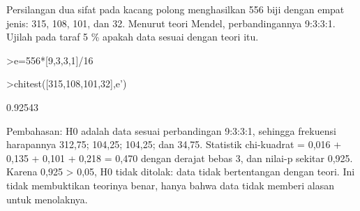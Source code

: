 \documentclass[a4paper,10pt]{article}
\begin{document}
\begin{eulernotebook}
\begin{eulercomment}
\begin{eulercomment}
\begin{eulercomment}
\begin{eulercomment}
\begin{eulercomment}
\begin{eulercomment}
\begin{eulercomment}
\begin{eulercomment}
\begin{eulercomment}
\begin{eulercomment}
\begin{eulercomment}
\begin{eulercomment}
\begin{eulercomment}
\begin{eulercomment}
\begin{eulercomment}
\begin{eulercomment}
\begin{eulercomment}
\begin{eulercomment}
\begin{eulercomment}
\begin{eulercomment}
\begin{eulercomment}
\begin{eulercomment}
\begin{eulercomment}
\begin{eulercomment}
\begin{eulercomment}
\begin{eulercomment}
\begin{eulercomment}
\begin{eulercomment}
\begin{eulercomment}
\begin{eulercomment}
\begin{eulercomment}
\end{eulercomment}
\begin{eulercomment}
Persilangan dua sifat pada kacang polong menghasilkan 556 biji dengan empat jenis: 315, 108,
101, dan 32. Menurut teori Mendel, perbandingannya 9:3:3:1. Ujilah pada taraf 5 \% apakah data
sesuai dengan teori itu.
\end{eulercomment}
\begin{eulerprompt}
>e=556*[9,3,3,1]/16
\end{eulerprompt}
\begin{euleroutput}
  [312.75,  104.25,  104.25,  34.75]
\end{euleroutput}
\begin{eulerprompt}
>chitest([315,108,101,32],e')
\end{eulerprompt}
\begin{euleroutput}
  0.92543
\end{euleroutput}
\begin{eulercomment}
Pembahasan: H0 adalah data sesuai perbandingan 9:3:3:1, sehingga frekuensi harapannya 312,75;
104,25; 104,25; dan 34,75. Statistik chi-kuadrat = 0,016 + 0,135 + 0,101 + 0,218 = 0,470
dengan derajat bebas 3, dan nilai-p sekitar 0,925. Karena 0,925 \textgreater{} 0,05, H0 tidak ditolak:
data tidak bertentangan dengan teori. Ini tidak membuktikan teorinya benar, hanya bahwa data
tidak memberi alasan untuk menolaknya.


\end{eulercomment}
\end{eulercomment}
\end{eulercomment}
\end{eulercomment}
\end{eulercomment}
\end{eulercomment}
\end{eulercomment}
\end{eulercomment}
\end{eulercomment}
\end{eulercomment}
\end{eulercomment}
\end{eulercomment}
\end{eulercomment}
\end{eulercomment}
\end{eulercomment}
\end{eulercomment}
\end{eulercomment}
\end{eulercomment}
\end{eulercomment}
\end{eulercomment}
\end{eulercomment}
\end{eulercomment}
\end{eulercomment}
\end{eulercomment}
\end{eulercomment}
\end{eulercomment}
\end{eulercomment}
\end{eulercomment}
\end{eulercomment}
\end{eulercomment}
\end{eulercomment}
\end{eulernotebook}
\end{document}
